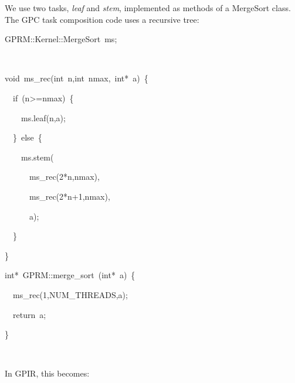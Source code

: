 \documentclass[copyright,creativecommons]{eptcs}
\newenvironment{lyxcode}
{\par\begin{list}{}{
\setlength{\rightmargin}{\leftmargin}
\setlength{\listparindent}{0pt}\raggedright
\setlength{\itemsep}{0pt}
\setlength{\parsep}{0pt}
\normalfont\ttfamily}\item[]}
{\end{list}}
\begin{document}
We use two tasks, \emph{leaf} and \emph{stem}, implemented as methods
of a MergeSort class. The GPC task composition code uses a recursive
tree: 
\begin{lyxcode}
{\small GPRM::Kernel::MergeSort~ms;}{\small \par}

~

{\small void~ms\_rec(int~n,int~nmax,~int{*}~a)~\{}{\small \par}

{\small{}~~if~(n>=nmax)~\{}{\small \par}

{\small{}~~~~ms.leaf(n,a);~}{\small \par}

{\small{}~~\}~else~\{}{\small \par}

{\small{}~~~~ms.stem(}{\small \par}

{\small{}~~~~~~ms\_rec(2{*}n,nmax),}{\small \par}

{\small{}~~~~~~ms\_rec(2{*}n+1,nmax),}{\small \par}

{\small{}~~~~~~a);}{\small \par}

{\small{}~~\}}{\small \par}

\}



{\small int{*}~GPRM::merge\_sort~(int{*}~a)~\{}{\small \par}

{\small{}~~ms\_rec(1,NUM\_THREADS,a);~}{\small \par}

{\small{}~~return~a;}{\small \par}

{\small \}}{\small \par}

~
\end{lyxcode}
In GPIR, this becomes:
\end{document}
